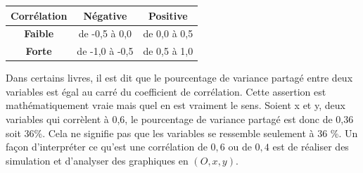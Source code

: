 \begin{center}
\begin{tabular}{|c|c|c|}\hline

\textbf{Corrélation} &  	\textbf{Négative} &  	\textbf{Positive} \\\hline
\textbf{Faible} 	& de -0,5 à 0,0 	& de 0,0 à 0,5 \\\hline
\textbf{Forte} &	de -1,0 à -0,5 &	de 0,5 à 1,0\\
\hline
\end{tabular}
\end{center}
Dans certains livres, il est dit que le pourcentage de variance partagé entre deux variables est égal au carré du coefficient de corrélation. Cette assertion est mathématiquement vraie mais quel en est vraiment le sens. Soient x et y, deux variables qui corrèlent à 0,6, le pourcentage de variance partagé est donc de 0,36 soit 36\%. Cela ne signifie pas que les variables se ressemble seulement à 36 \%.\newline
Un façon d'interpréter ce qu'est une corrélation de $0,6$ ou de $0,4$ est de réaliser des simulation et d'analyser des graphiques en $(O,x,y)$.

